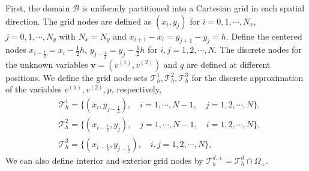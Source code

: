 \documentclass[preprint,11pt]{elsarticle}
\theoremstyle{remark}
\newcommand{\mc}[1]{\mathcal{#1}}
\newcommand{\bm}[1]{\boldsymbol{#1}}
\begin{document}
First, the domain $\mathcal{B}$ is uniformly partitioned into a Cartesian grid in each spatial direction. The grid nodes are defined as $(x_i, y_j)$ for $i=0,1,\cdots, N_x$, $j=0,1,\cdots, N_y$ with $N_x = N_y$ and $x_{i+1}-x_i = y_{j+1}-y_j = h$. 
Define the centered nodes $x_{i-\frac{1}{2}} = x_i - \frac{1}{2}h$, $y_{j-\frac{1}{2}} = y_j - \frac{1}{2}h$ for $i, j = 1, 2, \cdots, N$.
The discrete nodes for the unknown variables $\bm v = (v^{(1)}, v^{(2)})$ and $q$ are defined at different positions. 
We define the grid node sets $\mathcal{T}^1_h, \mathcal{T}^2_h,\mathcal{T}^3_h$ for the discrete approximation of the variables $v^{(1)}, v^{(2)}, p$, respectively,
\begin{align}
    &\mathcal{T}^1_h = \{(x_i, y_{j-\frac{1}{2}}), \quad i=1,\cdots, N-1, \quad j = 1,2,\cdots,N \}, \\
    &\mathcal{T}^2_h = \{(x_{i-\frac{1}{2}}, y_j), \quad j=1,\cdots, N-1, \quad i = 1,2,\cdots,N \},\\
    &\mathcal{T}^3_h = \{(x_{i-\frac{1}{2}}, y_{j-\frac{1}{2}}), \quad i,j = 1,2,\cdots,N \},
\end{align}
We can also define interior and exterior grid nodes by
$
    \mc T_h^{d, \pm} = \mc T_h^d\cap \Omega_\pm .
$
\end{document}
